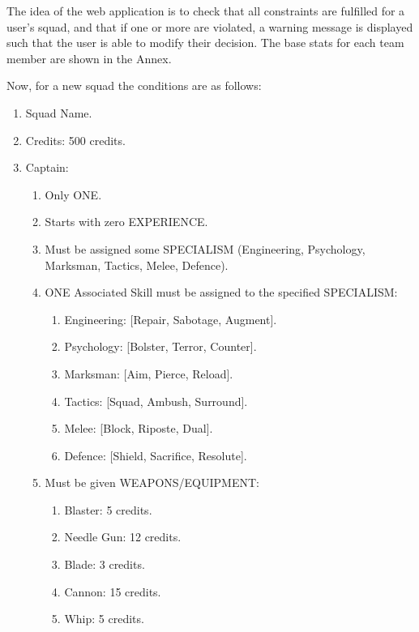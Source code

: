 \documentclass[12pt,a4paper]{article}
\begin{document}
The idea of the web application is to check that all constraints are fulfilled for a user's squad, and that if one or more are violated, a warning message is displayed such that the user is able to modify their decision. The base stats for each team member are shown in the Annex.

Now, for a new squad the conditions are as follows:

\begin{enumerate}
 \item Squad Name.
 \item Credits: 500 credits.
 \item Captain: \begin{enumerate}
                 \item Only ONE.
                 \item Starts with zero EXPERIENCE.
                 \item Must be assigned some SPECIALISM (Engineering, Psychology, Marksman, Tactics, Melee, Defence).
                 \item ONE Associated Skill must be assigned to the specified SPECIALISM: \begin{enumerate}
							  \item Engineering: [Repair, Sabotage, Augment].
							  \item Psychology: [Bolster, Terror, Counter].
							  \item Marksman: [Aim, Pierce, Reload].
							  \item Tactics: [Squad, Ambush, Surround].
							  \item Melee: [Block, Riposte, Dual].
							  \item Defence: [Shield, Sacrifice, Resolute].
							 \end{enumerate}
				 \item Must be given WEAPONS/EQUIPMENT: \begin{enumerate}
				                                         \item Blaster: 5 credits.
				                                         \item Needle Gun: 12 credits.
				                                         \item Blade: 3 credits.
				                                         \item Cannon: 15 credits.
				                                         \item Whip: 5 credits.
				                                        \end{enumerate}

\end{enumerate}
\end{enumerate}
\end{document}
